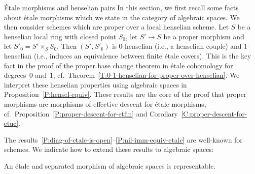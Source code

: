 \documentclass[a4paper,twoside,11pt]{amsart}[2009/07/02] %
\newcommand{\pref}[1]{\eqref{#1}}
\newcommand{\map}[3]{#1\,:\, #2\rightarrow #3}
\newcommand{\etale}{\'{e}tale}
\newcommand{\Etale}{\'{E}tale}
\begin{document}
\appendix
\begin{section}{\Etale{} morphisms and henselian pairs}\label{S:etale-henselian}
In this section, we first recall some facts about \etale{} morphisms which we
state in the category of algebraic spaces. We then consider schemes which are
proper over a local henselian scheme. Let $S$ be a henselian local ring with
closed point $S_0$, let $S'\to S$ be a proper morphism and let
$S'_0=S'\times_S S_0$. Then $(S',S'_0)$ is $0$-henselian (i.e., a henselian
couple) and $1$-henselian (i.e., induces an equivalence between finite \etale{}
covers). This is the key fact in the proof of the proper base change theorem in
\etale{} cohomology for degrees~$0$ and~$1$, cf.\ 
Theorem~\pref{T:0-1-henselian-for-proper-over-henselian}. We interpret these
henselian properties using algebraic spaces in
Proposition~\pref{P:hensel-equiv}. These results are the core of the proof that
proper morphisms are morphisms of effective descent for \etale{} morphisms,
cf.~Proposition~\pref{P:proper-descent-for-etfin} and
Corollary~\pref{C:proper-descent-for-etqc}.

The results~\pref{P:diag-of-etale-is-open}--\pref{P:nil-imm-equiv-etale} are
well-known for schemes. We indicate how to extend these results to algebraic
spaces:

\begin{proposition}
\label{P:etale+sep-is-repr}
An \etale{} and separated morphism of algebraic spaces is representable.
\end{proposition}



\end{section}
\end{document}
